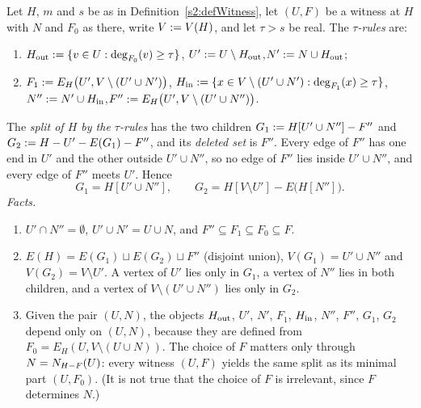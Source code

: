 \begin{definition}\label{s2:defTauRules}
Let $H$, $m$ and $s$ be as in Definition~\ref{s2:defWitness}, let $(U,F)$ be a
witness at $H$ with $N$ and $F_0$ as there, write $V\mathrel{:=} V(H)$, and let
$\tau>s$ be real. The \emph{$\tau$-rules} are:
\begin{enumerate}
\item[(1)] $H_{\mathrm{out}}\mathrel{:=}\{v\in U:\deg_{F_0}(v)\ge\tau\}$,\quad
$U'\mathrel{:=} U\setminus H_{\mathrm{out}}$,\quad $N'\mathrel{:=} N\cup H_{\mathrm{out}}$;
\item[(2)] $F_1\mathrel{:=} E_H\bigl(U',V\setminus(U'\cup N')\bigr)$,\quad
$H_{\mathrm{in}}\mathrel{:=}\{x\in V\setminus(U'\cup N'):\deg_{F_1}(x)\ge\tau\}$,\quad
$N''\mathrel{:=} N'\cup H_{\mathrm{in}}$,\quad $F''\mathrel{:=} E_H\bigl(U',V\setminus(U'\cup
N'')\bigr)$.
\end{enumerate}
The \emph{split of $H$ by the $\tau$-rules} has the two children
$G_1\mathrel{:=} H[U'\cup N'']-F''$ and $G_2\mathrel{:=} H-U'-E(G_1)-F''$, and its
\emph{deleted set} is $F''$. Every edge of $F''$ has one end in $U'$ and the
other outside $U'\cup N''$, so no edge of $F''$ lies inside $U'\cup N''$, and
every edge of $F''$ meets $U'$. Hence
\begin{equation}\label{s2:eqSplit}
G_1=H[U'\cup N''],\qquad G_2=H[V\setminus U']-E\bigl(H[N'']\bigr).
\end{equation}
\emph{Facts.}
\begin{enumerate}
\item[(a)] $U'\cap N''=\emptyset$, $U'\cup N'=U\cup N$, and
$F''\subseteq F_1\subseteq F_0\subseteq F$.
\item[(b)] $E(H)=E(G_1)\sqcup E(G_2)\sqcup F''$ (disjoint union),
$V(G_1)=U'\cup N''$ and $V(G_2)=V\setminus U'$. A vertex of $U'$ lies only in
$G_1$, a vertex of $N''$ lies in both children, and a vertex of
$V\setminus(U'\cup N'')$ lies only in $G_2$.
\item[(c)] Given the pair $(U,N)$, the objects $H_{\mathrm{out}}$, $U'$, $N'$,
$F_1$, $H_{\mathrm{in}}$, $N''$, $F''$, $G_1$, $G_2$ depend only on $(U,N)$, because
they are defined from $F_0=E_H(U,V\setminus(U\cup N))$. The choice of $F$
matters only through $N=N_{H-F}(U)$: every witness $(U,F)$ yields the
same split as its minimal part $(U,F_0)$. (It is not true that the choice of
$F$ is irrelevant, since $F$ determines $N$.)
\end{enumerate}
\deps{\ref{s2:defWitness}}
\end{definition}

